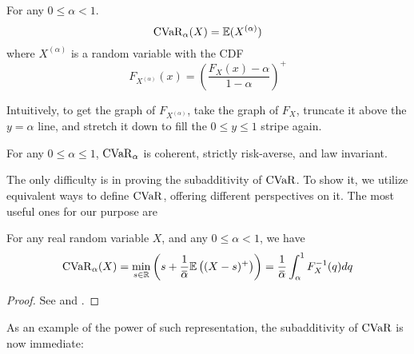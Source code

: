 \begin{defn}\label{defn:cvar}
For any $0\le\alpha < 1$.
\begin{equation}
\label{eq:def_cvar}
\operatorname{CVaR}_\alpha(X) = \mathbb{E}(X^{(\alpha)})
\end{equation}
where $X^{(\alpha)}$ is a random variable with the CDF 
\begin{equation}
\label{eq:def_cvar_CDF}
F_{X^{(\alpha)}}(x) =  \left( \frac{F_X(x)-\alpha}{1-\alpha}\right)^+
\end{equation}
\end{defn}

Intuitively, to get the graph of $F_{X^{(\alpha)}}$, take the graph of $F_X$, truncate it above the $y=\alpha$ line, and stretch it down to fill the $0 \le y \le 1$ stripe again.

\begin{theorem}
For any $0 \le\alpha\le 1$, $\operatorname{CVaR}_\alpha$ is coherent, strictly risk-averse, and law invariant.
\end{theorem}

The only difficulty is in proving the subadditivity of $\operatorname{CVaR}$. To show it, we utilize equivalent ways to define $\operatorname{CVaR}$, offering different perspectives on it. The most useful ones for our purpose are

\begin{prop}
For any real random variable $X$, and any $0\le \alpha<1$, we have 
	\begin{equation}\label{eq:cvar_defs}
		\cvar_\alpha(X) = 
		\min_{s \in\mathbb{R}}
			\left(s+\frac{1}{{\overbar{\alpha}}} \mathbb{E}\left((X-s)^{+}\right)\right) = 
		\frac{1}{{\overbar{\alpha}}} \int_\alpha^1 F_X^{-1}(q) dq
	\end{equation}
\end{prop}
\begin{proof}
See \cite[Theorem 10]{rockafellarConditionalValueatriskGeneral2002} and \cite[Proposition 3.2]{acerbiCoherenceExpectedShortfall2002}. 
\end{proof}

As an example of the power of such representation, the subadditivity of $\operatorname{CVaR}$ is now immediate:

